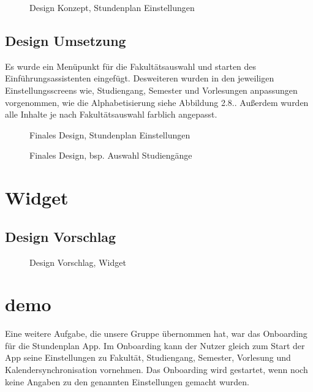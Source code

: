 \begin{figure}[H]
	\centering
	\caption{Design Konzept, Stundenplan Einstellungen}
	\label{fig1}
\end{figure}

\subsection{Design Umsetzung}
Es wurde ein Menüpunkt für die Fakultätsauswahl und starten des Einführungsassistenten eingefügt. Desweiteren wurden in den jeweiligen Einstellungsscreens wie, Studiengang, Semester und Vorlesungen anpassungen vorgenommen, wie die Alphabetisierung siehe Abbildung 2.8.. Außerdem wurden alle Inhalte je nach Fakultätsauswahl farblich angepasst.

\begin{figure}[H]
	\centering
	\caption{Finales Design, Stundenplan Einstellungen}
	\label{fig1}
\end{figure}

\begin{figure}[H]
	\centering
	\caption{Finales Design, bsp. Auswahl Studiengänge}
	\label{fig1}
\end{figure}

\section{Widget}

\subsection{Design Vorschlag}

\begin{figure}[H]
	\centering
	\caption{Design Vorschlag, Widget}
	\label{fig1}
\end{figure}




\section{demo}
Eine weitere Aufgabe, die unsere Gruppe übernommen hat, war das Onboarding für die Stundenplan App. Im Onboarding kann der Nutzer gleich zum Start der App seine Einstellungen zu Fakultät, Studiengang, Semester, Vorlesung und Kalendersynchronisation vornehmen. Das Onboarding wird gestartet, wenn noch keine Angaben zu den genannten Einstellungen gemacht wurden.

